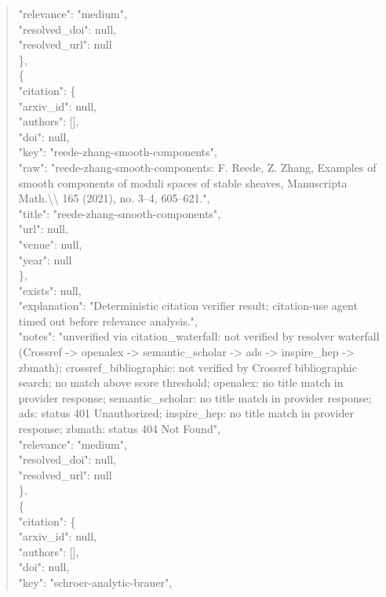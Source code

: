 \documentclass[11pt]{article}
\begin{document}
\begin{quote}
      "relevance": "medium",\\
      "resolved\_doi": null,\\
      "resolved\_url": null\\
    \},\\
    \{\\
      "citation": \{\\
        "arxiv\_id": null,\\
        "authors": [],\\
        "doi": null,\\
        "key": "reede-zhang-smooth-components",\\
        "raw": "reede-zhang-smooth-components: F. Reede, Z. Zhang, Examples of smooth components of moduli spaces of stable sheaves, Manuscripta Math.\textbackslash{}\textbackslash{} 165 (2021), no. 3--4, 605--621.",\\
        "title": "reede-zhang-smooth-components",\\
        "url": null,\\
        "venue": null,\\
        "year": null\\
      \},\\
      "exists": null,\\
      "explanation": "Deterministic citation verifier result; citation-use agent timed out before relevance analysis.",\\
      "notes": "unverified via citation\_waterfall: not verified by resolver waterfall (Crossref -> openalex -> semantic\_scholar -> ads -> inspire\_hep -> zbmath); crossref\_bibliographic: not verified by Crossref bibliographic search; no match above score threshold; openalex: no title match in provider response; semantic\_scholar: no title match in provider response; ads: status 401 Unauthorized; inspire\_hep: no title match in provider response; zbmath: status 404 Not Found",\\
      "relevance": "medium",\\
      "resolved\_doi": null,\\
      "resolved\_url": null\\
    \},\\
    \{\\
      "citation": \{\\
        "arxiv\_id": null,\\
        "authors": [],\\
        "doi": null,\\
        "key": "schroer-analytic-brauer",\\

\end{quote}
\end{document}
